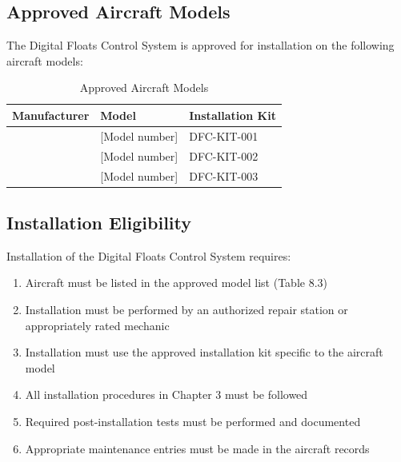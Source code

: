 \documentclass[12pt,a4paper,twoside,openright]{book}
\newcommand{\tabletextfont}{\normalfont\rmfamily}
\newcommand{\tableheadfont}{\normalfont\bfseries}
\begin{document}
\subsection{Approved Aircraft Models}

The Digital Floats Control System is approved for installation on the following aircraft models:

\begin{table}[h]
\centering
\setlength{\tabcolsep}{5pt} %
\begin{tabular}{|p{}|p{}|p{}|}
\hline
\tableheadfont\textbf{Manufacturer} & \tableheadfont\textbf{Model} & \tableheadfont\textbf{Installation Kit} \\
\hline
\tabletextfont {\color{missingred}[Missing information: Aircraft manufacturer and model]} & {\color{missingred}[Model number]} & DFC-KIT-001 \\
\hline
\tabletextfont {\color{missingred}[Missing information: Aircraft manufacturer and model]} & {\color{missingred}[Model number]} & DFC-KIT-002 \\
\hline
\tabletextfont {\color{missingred}[Missing information: Aircraft manufacturer and model]} & {\color{missingred}[Model number]} & DFC-KIT-003 \\
\hline
\end{tabular}
\caption{Approved Aircraft Models}
\end{table}

\subsection{Installation Eligibility}

Installation of the Digital Floats Control System requires:

\begin{enumerate}
    \item Aircraft must be listed in the approved model list (Table 8.3)
    \item Installation must be performed by an authorized repair station or appropriately rated mechanic
    \item Installation must use the approved installation kit specific to the aircraft model
    \item All installation procedures in Chapter 3 must be followed
    \item Required post-installation tests must be performed and documented
    \item Appropriate maintenance entries must be made in the aircraft records
\end{enumerate}
\end{document}
